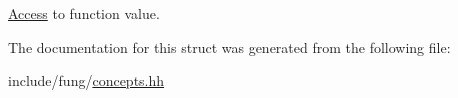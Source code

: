 \hyperlink{namespaceFunG_1_1Access}{Access} to function value. 



The documentation for this struct was generated from the following file\+:\begin{DoxyCompactItemize}
\item 
include/fung/\hyperlink{concepts_8hh}{concepts.\+hh}\end{DoxyCompactItemize}
